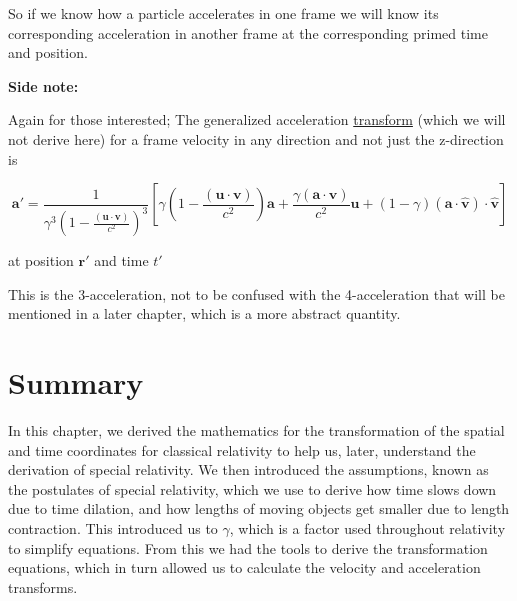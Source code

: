 So if we know how a particle accelerates in one frame we will know its corresponding acceleration in another frame at the corresponding primed time and position.

\textbf{Side note:}

Again for those interested; The generalized acceleration \hyperlink{def-transform}{transform} (which we will not derive here) for a frame velocity in any direction and not just the z-direction is

\begin{equation}
	\mathbf{a{'}} = \frac{1}{{\gamma} ^3 \left(1-\frac{(\mathbf{u}\cdot \mathbf{v})}{{c}^2}\right)^3}\left[ {\gamma} \left(1-\frac{(\mathbf{u}\cdot\mathbf{v})}{{c}^2}\right)\mathbf{a} + \frac{{\gamma} (\mathbf{a}\cdot\mathbf{v})}{{c}^2}\mathbf{u} + (1-{\gamma} ) (\mathbf{a}\cdot\hat{\mathbf{v}}) \cdot\hat{\mathbf{v}}\right]
\end{equation}

at position ${\mathbf{r}{'}}$ and time ${t{'}}$

This is the 3-acceleration, not to be confused with the 4-acceleration that will be mentioned in a later chapter, which is a more abstract quantity.

\section{Summary}

In this chapter, we derived the mathematics for the transformation of the spatial and time coordinates for classical relativity to help us, later, understand the derivation of special relativity.
We then introduced the assumptions, known as the postulates of special relativity, which we use to derive how time slows down due to time dilation, and how lengths of moving objects get smaller due to length contraction.
This introduced us to $\gamma$, which is a factor used throughout relativity to simplify equations.
From this we had the tools to derive the transformation equations, which in turn allowed us to calculate the velocity and acceleration transforms.

